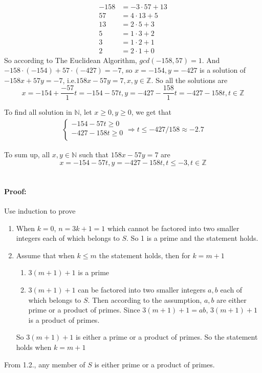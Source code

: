 \documentclass[a4paper,12pt,titlepage]{article}
\begin{document}
\subsection{}
\begin{align*}
-158&=-3\cdot57+13\\
57&=4\cdot13+5\\
13&=2\cdot5+3\\
5&=1\cdot 3+2\\
3&=1\cdot 2+1\\
2&=2\cdot 1+0
\end{align*}
So according to The Euclidean Algorithm,  $gcd(-158,57)=1$. And $-158\cdot(-154)+57\cdot(-427)=-7$, so $x=-154,y=-427$ is a solution of $-158x+57y=-7$, i.e.$158x-57y=7,x,y\in\mathbb{Z}$. So all the solutions are
$$x=-154+\dfrac{-57}{1}t=-154-57t,y=-427-\dfrac{158}{1}t=-427-158t,t\in\mathbb{Z}$$

To find all solution in $\mathbb{N}$, let $x\geqslant0,y\geqslant0$, we get that
\begin{align*}
\left\{
\begin{aligned}
-154-57t\geqslant0\\
-427-158t\geqslant0\\
\end{aligned}
\right.\Rightarrow t\leqslant-427/158\approx-2.7
\end{align*}

To sum up, all $x,y\in\mathbb{N} $ such that $158x-57y=7$ are
$$x=-154-57t,y=-427-158t,t\leqslant-3,t\in\mathbb{Z}$$

\section{}
\subsection{}
\paragraph{Proof:} Use induction to prove
\begin{enumerate}
\item When $k=0$, $n=3k+1=1$ which cannot be factored into two smaller integers each of which belongs to $S$. So 1 is a prime and the statement holds.

\item Assume that when $k\leqslant m$ the statement holds, then for $k=m+1$
\begin{enumerate}
\item $3(m+1)+1$ is a prime
\item $3(m+1)+1$ can be factored into two smaller integers $a,b$ each of which belongs to $S$. Then according to the assumption, $a,b$ are either prime or a product of primes. Since $3(m+1)+1=ab$, $3(m+1)+1$ is a product of primes.
\end{enumerate}
So $3(m+1)+1$ is either a prime or a product of primes. So the statement holds when $k=m+1$
\end{enumerate}
From 1.2., any member of $S$ is either prime or a product of primes.
\end{document}
